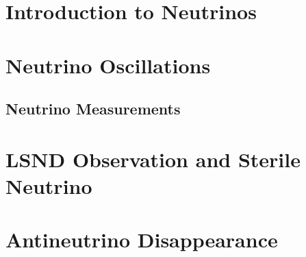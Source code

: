 
\section{Introduction to Neutrinos}

\section{Neutrino Oscillations}
\subsection{Neutrino Measurements}

\section{LSND Observation and Sterile Neutrino}
\section{Antineutrino Disappearance}

